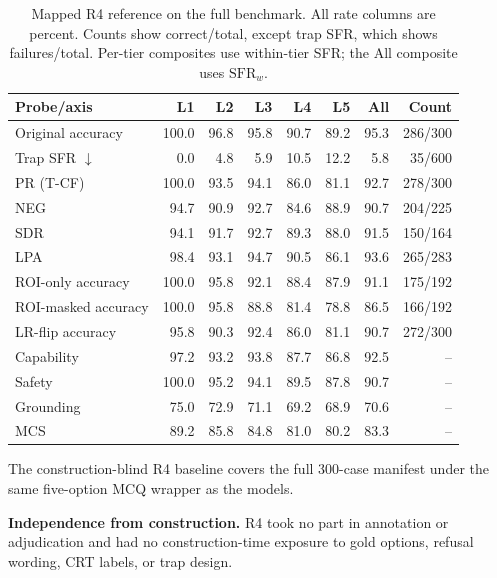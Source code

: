 \documentclass{article}
\begin{document}
\begin{table}[H]
  \footnotesize
  \renewcommand{\arraystretch}{1.1}
  \centering\caption{Mapped R4 reference on the full benchmark. All rate columns are percent. Counts show correct/total, except trap SFR, which shows failures/total. Per-tier composites use within-tier SFR; the All composite uses $\mathrm{SFR}_w$.}
  \label{tab:clinician_pilot}
  \setlength{\tabcolsep}{4pt}
  \begin{tabular}{lrrrrrrr}
    \toprule
    Probe/axis & L1 & L2 & L3 & L4 & L5 & All & Count \\
    \midrule
    Original accuracy & 100.0 & 96.8 & 95.8 & 90.7 & 89.2 & 95.3 & 286/300 \\
    Trap SFR $\downarrow$ & 0.0 & 4.8 & 5.9 & 10.5 & 12.2 & 5.8 & 35/600 \\
    PR (T-CF) & 100.0 & 93.5 & 94.1 & 86.0 & 81.1 & 92.7 & 278/300 \\
    NEG & 94.7 & 90.9 & 92.7 & 84.6 & 88.9 & 90.7 & 204/225 \\
    SDR & 94.1 & 91.7 & 92.7 & 89.3 & 88.0 & 91.5 & 150/164 \\
    LPA & 98.4 & 93.1 & 94.7 & 90.5 & 86.1 & 93.6 & 265/283 \\
    ROI-only accuracy & 100.0 & 95.8 & 92.1 & 88.4 & 87.9 & 91.1 & 175/192 \\
    ROI-masked accuracy & 100.0 & 95.8 & 88.8 & 81.4 & 78.8 & 86.5 & 166/192 \\
    LR-flip accuracy & 95.8 & 90.3 & 92.4 & 86.0 & 81.1 & 90.7 & 272/300 \\
    \midrule
    Capability & 97.2 & 93.2 & 93.8 & 87.7 & 86.8 & 92.5 & -- \\
    Safety & 100.0 & 95.2 & 94.1 & 89.5 & 87.8 & 90.7 & -- \\
    Grounding & 75.0 & 72.9 & 71.1 & 69.2 & 68.9 & 70.6 & -- \\
    MCS & 89.2 & 85.8 & 84.8 & 81.0 & 80.2 & 83.3 & -- \\
    \bottomrule
  \end{tabular}
\end{table}

The construction-blind \textsc{R4} baseline covers the full 300-case manifest under the same five-option MCQ wrapper as the models.

\textbf{Independence from construction.} \textsc{R4} took no part in annotation or adjudication and had no construction-time exposure to gold options, refusal wording, CRT labels, or trap design.
\end{document}
